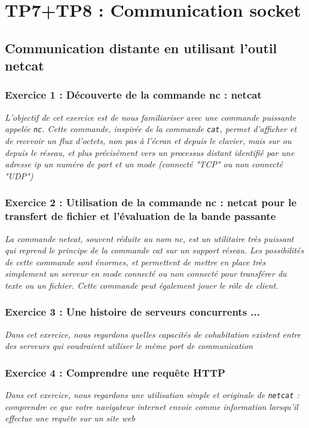 \chapter{TP7+TP8 : Communication socket}

\section{Communication distante en utilisant l’outil netcat}

\subsection{Exercice 1 : Découverte de la commande nc : netcat}
\textit{L’objectif de cet exercice est de nous familiariser avec une commande puissante appelée \texttt{nc}. Cette commande, inspirée de la commande \texttt{cat}, permet d’afficher et de recevoir un flux d’octets, non pas à l’écran et depuis le clavier, mais sur ou depuis le réseau, et plus précisément vers un processus distant identifié par une adresse ip un numéro de port et un mode (connecté "TCP" ou non connecté "UDP")}

\subsection{Exercice 2 : Utilisation de la commande nc : netcat pour le transfert de fichier et l’évaluation de la bande passante}
\textit{La commande netcat, souvent réduite au nom nc, est un utilitaire très puissant qui reprend le principe de la commande cat sur un support réseau. Les possibilités de cette commande sont énormes, et permettent de mettre en place très simplement un serveur en mode connecté ou non connecté pour transférer du texte ou un fichier. Cette commande peut également jouer le rôle de client.}

\subsection{Exercice 3 : Une histoire de serveurs concurrents ...}
\textit{Dans cet exercice, nous regardons quelles capacités de cohabitation existent entre des serveurs qui voudraient utiliser le même port de communication}

\subsection{Exercice 4 : Comprendre une requête HTTP}
\textit{Dans cet exercice, nous regardons une utilisation simple et originale de \texttt{netcat} : comprendre ce que votre navigateur internet envoie comme information lorsqu’il effectue une requête sur un site web}

